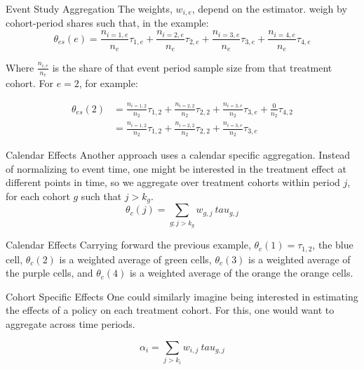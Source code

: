 \documentclass[11pt]{beamer}
\begin{document}
\begin{frame}{Event Study Aggregation}
    The weights, $w_{i,e}$, depend on the estimator. \textcite{sun2021estimating} weigh by cohort-period shares such that, in the example:
    \begin{equation}
        \theta_{es}(e) = \frac{n_{i=1, e}}{n_{e}} \tau_{1,e} + \frac{n_{i=2, e}}{n_{e}} \tau_{2,e}+\frac{n_{i=3, e}}{n_{e}} \tau_{3,e}+\frac{n_{i=4, e}}{n_{e}} \tau_{4,e}
    \end{equation}

    Where $\frac{n_{i,e}}{n_e}$ is the share of that event period sample size from that treatment cohort. For $e = 2$, for example:

    \begin{align*}
                \theta_{es}(2) &= \frac{n_{i=1, 2}}{n_{2}} \tau_{1,2} + \frac{n_{i=2, 2}}{n_{2}} \tau_{2,2}+\frac{n_{i=3, e}}{n_{2}} \tau_{3,e}+\frac{0}{n_{2}} \tau_{4,2} \\
                & = \frac{n_{i=1, 2}}{n_{2}} \tau_{1,2} + \frac{n_{i=2, 2}}{n_{2}} \tau_{2,2}+\frac{n_{i=3, e}}{n_{2}} \tau_{3,e}
    \end{align*}
\end{frame}

\begin{frame}{Calendar Effects}
    Another approach uses a calendar specific aggregation. Instead of normalizing to event time, one might be interested in the treatment effect at different points in time, so we aggregate over treatment cohorts within period $j$, for each cohort $g$ such that $j > k_g$.
    \begin{equation}
        \theta_c(j) = \sum_{g;j > k_g} w_{g,j} \ tau_{g,j}
    \end{equation}
\end{frame}

\begin{frame}{Calendar Effects}
    Carrying forward the previous example,  $\theta_{c}(1) = \tau_{1,2}$, the blue cell, $\theta_{c}(2)$ is a weighted average of green cells, $\theta_{c}(3)$ is a weighted average of the purple cells, and $\theta_{c}(4)$ is a weighted average of the orange the orange cells.

    
\end{frame}

\begin{frame}{Cohort Specific Effects}
    One could similarly imagine being interested in estimating the effects of a policy on each treatment cohort. For this, one would want to aggregate across time periods. 

    \begin{equation}
        \alpha_i = \sum_{j > k_i} w_{i,j} \ tau_{g,j}
    \end{equation}
\end{frame}
\end{document}
